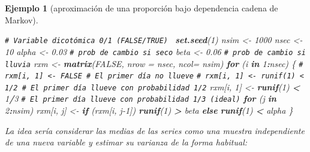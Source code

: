 \documentclass[
  spanish,
  10pt,
]{book}
\newenvironment{Shaded}{\begin{snugshade}}{\end{snugshade}}
\newcommand{\AttributeTok}[1]{\textcolor[rgb]{0.13,0.29,0.53}{#1}}
\newcommand{\CommentTok}[1]{\textcolor[rgb]{0.56,0.35,0.01}{\textit{#1}}}
\newcommand{\ConstantTok}[1]{\textcolor[rgb]{0.56,0.35,0.01}{#1}}
\newcommand{\ControlFlowTok}[1]{\textcolor[rgb]{0.13,0.29,0.53}{\textbf{#1}}}
\newcommand{\DecValTok}[1]{\textcolor[rgb]{0.00,0.00,0.81}{#1}}
\newcommand{\FloatTok}[1]{\textcolor[rgb]{0.00,0.00,0.81}{#1}}
\newcommand{\FunctionTok}[1]{\textcolor[rgb]{0.13,0.29,0.53}{\textbf{#1}}}
\newcommand{\NormalTok}[1]{#1}
\newcommand{\OtherTok}[1]{\textcolor[rgb]{0.56,0.35,0.01}{#1}}
\newcommand{\SpecialCharTok}[1]{\textcolor[rgb]{0.81,0.36,0.00}{\textbf{#1}}}
\theoremstyle{break}
\newtheorem{example}{Ejemplo}[chapter]
\theoremstyle{nonumberplain}
\renewcommand{\CommentTok}[1]{\textcolor[rgb]{0.41,0.41,0.41}{\texttt{#1}}}
\begin{document}
\begin{example}[aproximación de una proporción bajo dependencia cadena de Markov]
\begin{Shaded}
\begin{Highlighting}[]
\CommentTok{\# Variable dicotómica 0/1 (FALSE/TRUE)  }
\FunctionTok{set.seed}\NormalTok{(}\DecValTok{1}\NormalTok{)}
\NormalTok{nsim }\OtherTok{\textless{}{-}} \DecValTok{1000}
\NormalTok{nsec }\OtherTok{\textless{}{-}} \DecValTok{10}
\NormalTok{alpha }\OtherTok{\textless{}{-}} \FloatTok{0.03} \CommentTok{\# prob de cambio si seco}
\NormalTok{beta }\OtherTok{\textless{}{-}} \FloatTok{0.06}  \CommentTok{\# prob de cambio si lluvia}
\NormalTok{rxm }\OtherTok{\textless{}{-}} \FunctionTok{matrix}\NormalTok{(}\ConstantTok{FALSE}\NormalTok{, }\AttributeTok{nrow =}\NormalTok{ nsec, }\AttributeTok{ncol=}\NormalTok{ nsim)}
\ControlFlowTok{for}\NormalTok{ (i }\ControlFlowTok{in} \DecValTok{1}\SpecialCharTok{:}\NormalTok{nsec) \{}
  \CommentTok{\# rxm[i, 1] \textless{}{-} FALSE \# El primer día no llueve}
  \CommentTok{\# rxm[i, 1] \textless{}{-} runif(1) \textless{} 1/2 \# El primer día llueve con probabilidad 1/2}
\NormalTok{  rxm[i, }\DecValTok{1}\NormalTok{] }\OtherTok{\textless{}{-}} \FunctionTok{runif}\NormalTok{(}\DecValTok{1}\NormalTok{) }\SpecialCharTok{\textless{}} \DecValTok{1}\SpecialCharTok{/}\DecValTok{3} \CommentTok{\# El primer día llueve con probabilidad 1/3 (ideal)}
  \ControlFlowTok{for}\NormalTok{ (j }\ControlFlowTok{in} \DecValTok{2}\SpecialCharTok{:}\NormalTok{nsim)}
\NormalTok{    rxm[i, j] }\OtherTok{\textless{}{-}} \ControlFlowTok{if}\NormalTok{ (rxm[i, j}\DecValTok{{-}1}\NormalTok{]) }\FunctionTok{runif}\NormalTok{(}\DecValTok{1}\NormalTok{) }\SpecialCharTok{\textgreater{}}\NormalTok{ beta }\ControlFlowTok{else} \FunctionTok{runif}\NormalTok{(}\DecValTok{1}\NormalTok{) }\SpecialCharTok{\textless{}}\NormalTok{ alpha}
\NormalTok{\}}
\end{Highlighting}
\end{Shaded}

La idea sería considerar las medias de las series como una muestra independiente de una nueva variable y estimar su varianza de la forma habitual:


\end{example}
\end{document}

